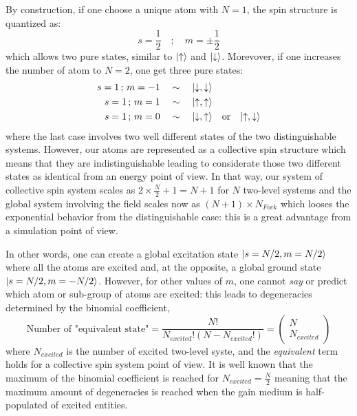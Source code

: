 \documentclass[10pt]{report}
\DeclarePairedDelimiter\ket{\lvert}{\rangle}
\begin{document}
By construction, if one choose a unique atom with $N=1$, the spin structure is quantized as:
\begin{equation}
s = \frac{1}{2} \quad; \quad m = \pm \frac{1}{2}
\end{equation}
which allows two pure states, similar to $\ket{\uparrow}$ and $\ket{\downarrow}$. Morevover, if one increases the number of atom to $N=2$, one get three pure states:
\begin{align*}
s = 1 \,;\, m = -1 \quad &\sim \quad \ket{\downarrow, \downarrow}\\
s = 1 \,;\, m = 1 \quad &\sim \quad \ket{\uparrow, \uparrow}\\
s = 1 \,;\, m = 0 \quad &\sim \quad \ket{\downarrow, \uparrow} \quad \textrm{or} \quad \ket{\uparrow, \downarrow}\\
\end{align*}
where the last case involves two well different states of the two distinguishable systems. However, our atoms are represented as a collective spin structure which means that they are indistinguishable leading to considerate those two different states as identical from an energy point of view. In that way, our system of collective spin system scales as $2 \times \frac{N}{2} + 1 = N + 1$ for $N$ two-level systems and the global system involving the field scales now as $(N+1) \times N_{Fock}$ which looses the exponential behavior from the distinguishable case: this is a great advantage from a simulation point of view.

In other words, one can create a global excitation state $\ket{s = N/2, m = N/2}$ where all the atoms are excited and, at the opposite, a global ground state $\ket{s = N/2, m = -N/2}$. However, for other values of $m$, one cannot \textit{say} or predict which atom or sub-group of atoms are excited: this leads to degeneracies determined by the binomial coefficient,
\begin{equation}
\textrm{Number of "equivalent state"} = \frac{N!}{N_{excited}!(N-N_{excited}!)} = \begin{pmatrix}
N\\
N_{excited}
\end{pmatrix} 	
\end{equation}
where $N_{excited}$ is the number of excited two-level syste, and the \textit{equivalent} term holds for a collective spin system point of view. It is well known that the maximum of the binomial coefficient is reached for $N_{excited} = \frac{N}{2}$ meaning that the maximum amount of degeneracies is reached when the gain medium is half-populated of excited entities.
\end{document}
